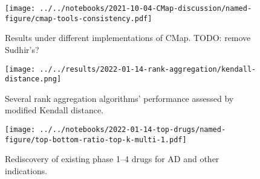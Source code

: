 \documentclass[letterpaper]{article}
\begin{document}
\begin{figure}[p]
\texttt{[image: ../../notebooks/2021-10-04-CMap-discussion/named-figure/cmap-tools-consistency.pdf]}
\caption{
Results under different implementations of CMap.
TODO: remove Sudhir's?
}
\label{fig:cmap-cmap}
\end{figure}

\begin{figure}[p]
\texttt{[image: ../../results/2022-01-14-rank-aggregation/kendall-distance.png]}
\caption{
Several rank aggregation algorithms' performance assessed by modified Kendall
distance.
}
\label{fig:kendall-dist}
\end{figure}

\begin{figure}[p]
\texttt{[image: ../../notebooks/2022-01-14-top-drugs/named-figure/top-bottom-ratio-top-k-multi-1.pdf]}
\caption{
Rediscovery of existing phase 1--4 drugs for AD and other indications.
}
\label{fig:ad-drug-rediscovery-multi}
\end{figure}
\end{document}
